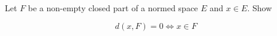Let $F$ be a non-empty closed part of a normed space $E$ and $x\in E$. Show

\[d(x, F) = 0 \iff x \in F\]